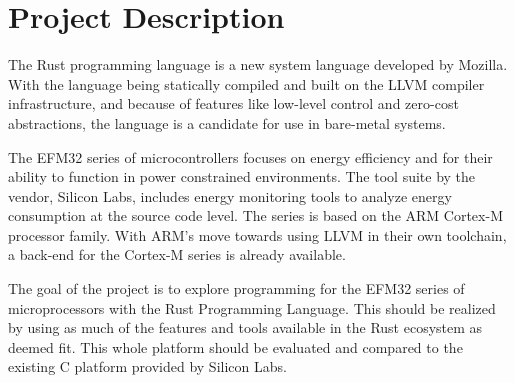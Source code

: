 
\chapter{Project Description}
\label{chap:problem}

The Rust programming language is a new system language developed by Mozilla.
With the language being statically compiled and built on the LLVM compiler infrastructure, and because of features like low-level control and zero-cost abstractions, the language is a candidate for use in bare-metal systems.

The EFM32 series of microcontrollers focuses on energy efficiency and for their ability to function in power constrained environments.
The tool suite by the vendor, Silicon Labs, includes energy monitoring tools to analyze energy consumption at the source code level.
The series is based on the ARM Cortex-M processor family.
With ARM's move towards using LLVM in their own toolchain, a back-end for the Cortex-M series is already available.

The goal of the project is to explore programming for the EFM32 series of microprocessors with the Rust Programming Language.
This should be realized by using as much of the features and tools available in the Rust ecosystem as deemed fit.
This whole platform should be evaluated and compared to the existing C platform provided by Silicon Labs.
